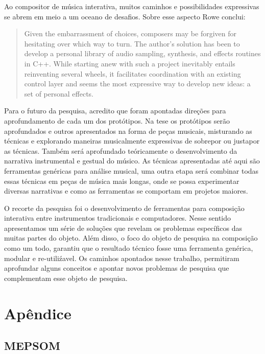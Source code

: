 \documentclass{ppgmus}
\begin{document}
Ao compositor de música interativa, muitos caminhos e possibilidades
expressivas se abrem em meio a um oceano de desafios. Sobre esse aspecto
Rowe\cite{rowe09:levels} conclui:

\begin{quotation}
 Given the embarrassment of choices,
composers may be forgiven for hesitating over
which way to turn. The author's solution has
been to develop a personal library of audio
sampling, synthesis, and effects routines in C++.
While starting anew with such a project
inevitably entails reinventing several wheels, it
facilitates coordination with an existing control
layer and seems the most expressive
way to develop new ideas: a set of personal
effects.
\end{quotation}


Para o futuro da pesquisa, acredito que foram apontadas direções para aprofundamento
de cada um dos protótipos. Na tese os  protótipos serão aprofundados e 
outros apresentados na forma de peças musicais, misturando as técnicas e explorando 
maneiras musicalmente expressivas de
sobrepor ou justapor as técnicas. Também será aprofundado teóricamente o 
desenvolvimento da narrativa instrumental e gestual do músico. 
As técnicas apresentadas até aqui são ferramentas genéricas para análise musical,
uma outra etapa será combinar todas essas técnicas em peças de música mais longas,
onde se possa experimentar diversas narrativas e como as ferramentas se comportam
em projetos maiores.

O recorte da pesquisa foi o desenvolvimento de ferramentas para composição
interativa entre instrumentos tradicionais e computadores. 
Nesse sentido apresentamos um série de soluções que revelam os problemas
específicos das muitas partes do objeto. Além disso, o foco do objeto
de pesquisa na composição como um todo, garantiu que o resultado técnico
fosse uma ferramenta genérica, modular e re-utiliźavel. 
Os caminhos apontados nesse trabalho, permitiram aprofundar alguns conceitos e apontar
novos problemas de pesquisa que complementam esse objeto de pesquisa.


 


\chapter{Apêndice}
\label{chap:anexos}


\section{MEPSOM}
\label{mepsom}
\end{document}
